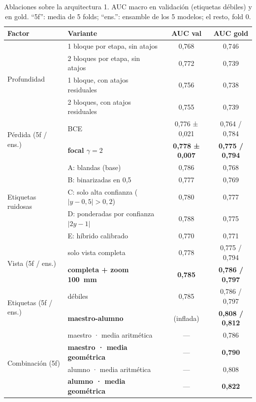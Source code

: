 \documentclass{article}
\begin{document}
\begin{table}[t]
  \centering
  \caption{Ablaciones sobre la arquitectura 1. AUC macro en validación (etiquetas débiles) y en gold. ``5f'': media de 5 folds; ``ens.'': ensamble de los 5 modelos; el resto, fold 0.}
  \label{tab:ablacion}
  \small
  \begin{tabular}{llcc}
    \toprule
    Factor & Variante & AUC val & AUC gold \\
    \midrule
    \multirow{4}{*}{Profundidad} & 1 bloque por etapa, sin atajos & 0,768 & 0,746 \\
     & 2 bloques por etapa, sin atajos & 0,772 & 0,739 \\
     & 1 bloque, con atajos residuales & 0,756 & 0,738 \\
     & 2 bloques, con atajos residuales & 0,755 & 0,739 \\
    \midrule
    \multirow{2}{*}{Pérdida (5f / ens.)} & BCE & 0,776 ± 0,021 & 0,764 / 0,784 \\
     & \textbf{focal $\gamma=2$} & \textbf{0,778 ± 0,007} & \textbf{0,775 / 0,794} \\
    \midrule
    \multirow{5}{*}{Etiquetas ruidosas} & A: blandas (base) & 0,786 & 0,768 \\
     & B: binarizadas en 0,5 & 0,777 & 0,769 \\
     & C: solo alta confianza ($|y-0{,}5|>0{,}2$) & 0,780 & 0,777 \\
     & D: ponderadas por confianza $|2y-1|$ & 0,788 & 0,775 \\
     & E: híbrido calibrado & 0,770 & 0,771 \\
    \midrule
    \multirow{2}{*}{Vista (5f / ens.)} & solo vista completa & 0,778 & 0,775 / 0,794 \\
     & \textbf{completa + zoom 100~mm} & \textbf{0,785} & \textbf{0,786 / 0,797} \\
    \midrule
    \multirow{2}{*}{Etiquetas (5f / ens.)} & débiles & 0,785 & 0,786 / 0,797 \\
     & \textbf{maestro-alumno} & (inflada) & \textbf{0,808 / 0,812} \\
    \midrule
    \multirow{4}{*}{Combinación (5f)} & maestro · media aritmética & --- & 0,786 \\
     & \textbf{maestro · media geométrica} & --- & \textbf{0,790} \\
     & alumno · media aritmética & --- & 0,808 \\
     & \textbf{alumno · media geométrica} & --- & \textbf{0,822} \\
    \bottomrule
  \end{tabular}
\end{table}
\end{document}
